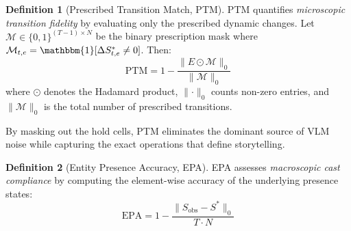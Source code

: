 \documentclass[sigconf,review,anonymous]{acmart}
\theoremstyle{definition}
\newtheorem{definition}{Definition}[section]
\begin{document}
\begin{definition}[Prescribed Transition Match, PTM]
\label{def:ptm}
PTM quantifies \emph{microscopic transition fidelity} by evaluating only the prescribed dynamic changes. Let $\mathcal{M} \in \{0,1\}^{(T-1) \times N}$ be the binary prescription mask where $\mathcal{M}_{t,e} = \mathbbm{1}[\Delta S^*_{t,e} \neq 0]$. Then:
\begin{equation}
\text{PTM} = 1 - \frac{\lVert E \odot \mathcal{M} \rVert_0}{\lVert \mathcal{M} \rVert_0}
\label{eq:ptm}
\end{equation}
where $\odot$ denotes the Hadamard product, $\lVert \cdot \rVert_0$ counts non-zero entries, and $\lVert \mathcal{M} \rVert_0$ is the total number of prescribed transitions.
\end{definition}

\noindent By masking out the hold cells, PTM eliminates the dominant source of VLM noise while capturing the exact operations that define storytelling.

\begin{definition}[Entity Presence Accuracy, EPA]
\label{def:epa}
EPA assesses \emph{macroscopic cast compliance} by computing the element-wise accuracy of the underlying presence states:
\begin{equation}
\text{EPA} = 1 - \frac{\lVert S_\text{obs} - S^* \rVert_0}{T \cdot N}
\label{eq:epa}
\end{equation}
\end{definition}
\end{document}

